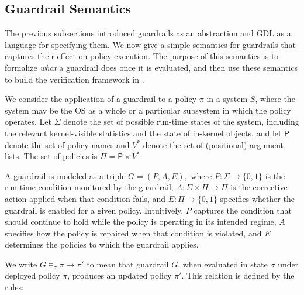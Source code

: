 \subsection{Guardrail Semantics}\label{subsection:semantics}

The previous subsections introduced guardrails as an abstraction and GDL as a language for specifying them. We now give a simple semantics for guardrails that captures their effect on policy execution. The purpose of this semantics is to formalize \emph{what} a guardrail does once it is evaluated, and then use these semantics to build the verification framework in .

We consider the application of a guardrail to a policy $\pi$ in a system $S$, where the system may be the OS as a whole or a particular subsystem in which the policy operates. Let $\Sigma$ denote the set of possible run-time states of the system, including the relevant kernel-visible statistics and the state of in-kernel objects, and let $\mathsf P$ denote the set of policy names and $V^*$ denote the set of (positional) argument lists. The set of policies is $\Pi = \mathsf P \times V^*$.

A guardrail is modeled as a triple
$
G = (P,A,E),
$
where $P : \Sigma \to \{0,1\}$ is the run-time condition monitored by the guardrail, $A : \Sigma \times \Pi \to \Pi$ is the corrective action applied when that condition fails, and $E : \Pi \to \{0,1\}$ specifies whether the guardrail is enabled for a given policy. Intuitively, $P$ captures the condition that should continue to hold while the policy is operating in its intended regime, $A$ specifies how the policy is repaired when that condition is violated, and $E$ determines the policies to which the guardrail applies.

We write
$ 
G \models_{\sigma} \pi \to \pi'
$
to mean that guardrail $G$, when evaluated in state $\sigma$ under deployed policy $\pi$, produces an updated policy $\pi'$. This relation is defined by the  rules:

